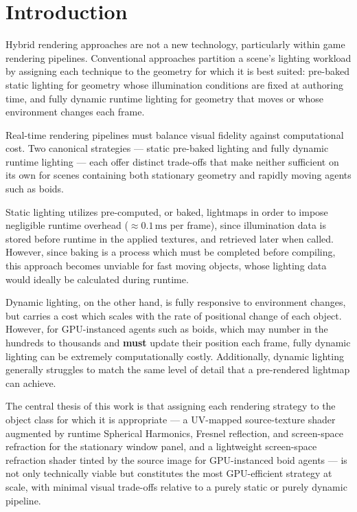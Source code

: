 \documentclass[12pt]{article}
\begin{document}
\section{Introduction}


Hybrid rendering approaches are not a new technology, particularly within game rendering pipelines. Conventional approaches partition a scene's lighting workload by assigning each technique to the geometry for which it is best suited: pre-baked static lighting for geometry whose illumination conditions are fixed at authoring time, and fully dynamic runtime lighting for geometry that moves or whose environment changes each frame.

Real-time rendering pipelines must balance visual fidelity against computational cost. Two canonical strategies --- static pre-baked lighting and fully dynamic runtime lighting --- each offer distinct trade-offs that make neither sufficient on its own for scenes containing both stationary geometry and rapidly moving agents such as boids.

Static lighting utilizes pre-computed, or baked, lightmaps in order to impose negligible runtime overhead ($\approx 0.1\,\text{ms}$ per frame), since illumination data is stored before runtime in the applied textures, and retrieved later when called. However, since baking is a process which must be completed before compiling, this approach becomes unviable for fast moving objects, whose lighting data would ideally be calculated during runtime.

Dynamic lighting, on the other hand, is fully responsive to environment changes, but carries a cost which scales with the rate of positional change of each object. However, for GPU-instanced agents such as boids, which may number in the hundreds to thousands and \textbf{must} update their position each frame, fully dynamic lighting can be extremely computationally costly. Additionally, dynamic lighting generally struggles to match the same level of detail that a pre-rendered lightmap can achieve.

The central thesis of this work is that assigning each rendering strategy to the object class for which it is appropriate --- a UV-mapped source-texture shader augmented by runtime Spherical Harmonics, Fresnel reflection, and screen-space refraction for the stationary window panel, and a lightweight screen-space refraction shader tinted by the source image for GPU-instanced boid agents --- is not only technically viable but constitutes the most GPU-efficient strategy at scale, with minimal visual trade-offs relative to a purely static or purely dynamic pipeline.
\end{document}
